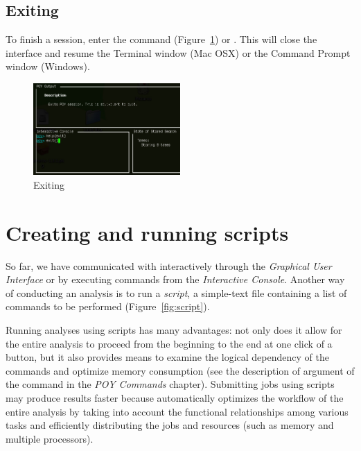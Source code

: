 \subsection{Exiting}
To finish a \poy session, enter the command  (Figure~\ref{fig:exithelp}) or . This will close the \poy interface and resume the Terminal window (Mac OSX) or the Command Prompt window (Windows).

\begin{figure}[]
    \begin{center}
        \includegraphics[width=0.5\textwidth]{doc/figures/exithelp.jpg}
    \end{center}
    \caption{Exiting \poy}
    \label{fig:exithelp}
\end{figure}

\section{Creating and running \poy scripts}

So far, we have communicated with \poy interactively through the \emph{Graphical User Interface} or by executing commands from the \emph{Interactive Console}. Another way of conducting an analysis is to run a \emph{script}, a simple-text file containing a list of commands to be performed (Figure~\ref{fig:script}). 

Running analyses using scripts has many advantages: not only does it allow for the entire analysis to proceed from the beginning to the end at one click of a button, but it also provides means to examine the logical dependency of the commands and optimize memory consumption (see the description of  argument of the command  in the \emph{POY Commands} chapter). Submitting jobs using scripts may produce results faster because \poy automatically optimizes the workflow of the entire analysis by taking into account the functional relationships among various tasks and efficiently distributing the jobs and resources (such as memory and multiple processors).

